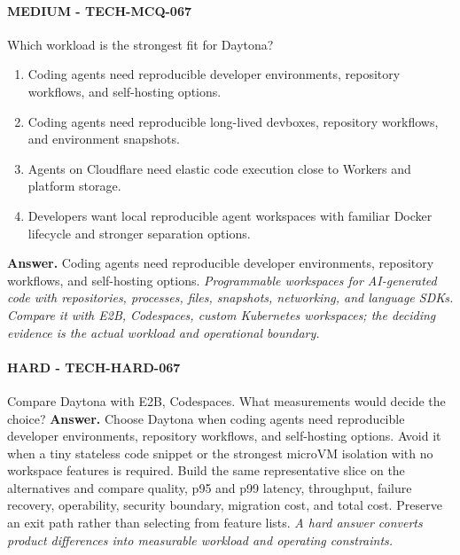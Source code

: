 \paragraph{MEDIUM - TECH-MCQ-067} Which workload is the strongest fit for Daytona?
\begin{enumerate}[label=\Alph*.]
\item Coding agents need reproducible developer environments, repository workflows, and self-hosting options.
\item Coding agents need reproducible long-lived devboxes, repository workflows, and environment snapshots.
\item Agents on Cloudflare need elastic code execution close to Workers and platform storage.
\item Developers want local reproducible agent workspaces with familiar Docker lifecycle and stronger separation options.
\end{enumerate}
\textbf{Answer.} Coding agents need reproducible developer environments, repository workflows, and self-hosting options.
\textit{Programmable workspaces for AI-generated code with repositories, processes, files, snapshots, networking, and language SDKs. Compare it with E2B, Codespaces, custom Kubernetes workspaces; the deciding evidence is the actual workload and operational boundary.}
\paragraph{HARD - TECH-HARD-067} Compare Daytona with E2B, Codespaces. What measurements would decide the choice?
\textbf{Answer.} Choose Daytona when coding agents need reproducible developer environments, repository workflows, and self-hosting options. Avoid it when a tiny stateless code snippet or the strongest microVM isolation with no workspace features is required. Build the same representative slice on the alternatives and compare quality, p95 and p99 latency, throughput, failure recovery, operability, security boundary, migration cost, and total cost. Preserve an exit path rather than selecting from feature lists.
\textit{A hard answer converts product differences into measurable workload and operating constraints.}
